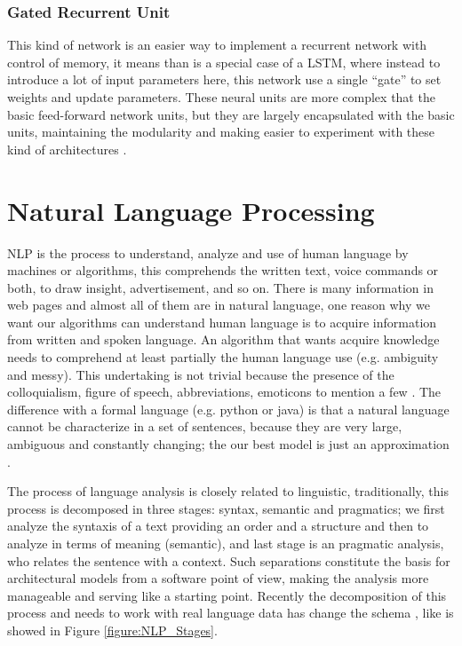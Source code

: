 \documentclass[12pt]{report}
\begin{document}
\subsubsection{Gated Recurrent Unit}
This kind of network is an easier way to implement a recurrent network with control of memory, it means than is a special case of a \ac{LSTM}, where instead to introduce a lot of input parameters here, this network use a single ``gate'' to set weights and update parameters. These neural units are more complex that the basic feed-forward network units, but they are largely encapsulated with the basic units, maintaining the modularity and making easier to experiment with these kind of architectures \cite{Jurafsky2018}.

\section{Natural Language Processing}

\ac{NLP} is the process to understand, analyze and use of human language by machines or algorithms, this comprehends the written text, voice commands or both, to draw insight, advertisement, and so on. There is many information in web pages and almost all of them are in natural language, one reason why we want our algorithms can understand human language is to acquire information from written and spoken language. An algorithm that wants acquire knowledge needs to comprehend at least partially the human language use (e.g. ambiguity and messy). This undertaking is not trivial because the presence of the colloquialism, figure of speech, abbreviations, emoticons to mention a few \cite{Nevala2017} \cite{Russell2010}. The difference with a formal language (e.g. python or java) is that a natural language cannot be characterize in a set of sentences, because they are very large, ambiguous and constantly changing; the our best model is just an approximation \cite{Russell2010}.

The process of language analysis is closely related to linguistic, traditionally, this process is decomposed in three stages: syntax, semantic and pragmatics; we first analyze the syntaxis of a text providing an order and a structure and then to analyze in terms of meaning (semantic), and last stage is an pragmatic analysis, who relates the sentence with a context. Such separations constitute the basis for architectural models from a software point of view, making the analysis more manageable and serving like a starting point. Recently the decomposition of this process and needs to work with real language data has change the schema \cite{Indurkhya2010}, like is showed in Figure \ref{figure:NLP_Stages}.
\end{document}
